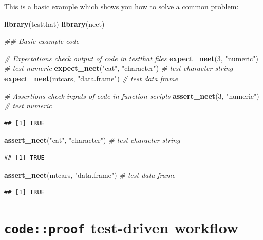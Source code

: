 \documentclass[
]{article}
\newenvironment{Shaded}{\begin{snugshade}}{\end{snugshade}}
\newcommand{\CommentTok}[1]{\textcolor[rgb]{0.56,0.35,0.01}{\textit{#1}}}
\newcommand{\DecValTok}[1]{\textcolor[rgb]{0.00,0.00,0.81}{#1}}
\newcommand{\KeywordTok}[1]{\textcolor[rgb]{0.13,0.29,0.53}{\textbf{#1}}}
\newcommand{\NormalTok}[1]{#1}
\newcommand{\StringTok}[1]{\textcolor[rgb]{0.31,0.60,0.02}{#1}}
\begin{document}
This is a basic example which shows you how to solve a common problem:

\begin{Shaded}
\begin{Highlighting}[]
\KeywordTok{library}\NormalTok{(testthat)}
\KeywordTok{library}\NormalTok{(neet)}

\CommentTok{\#\# Basic example code}

\CommentTok{\# Expectations check output of code in testthat files}
\KeywordTok{expect\_neet}\NormalTok{(}\DecValTok{3}\NormalTok{, }\StringTok{"numeric"}\NormalTok{) }\CommentTok{\# test numeric}
\KeywordTok{expect\_neet}\NormalTok{(}\StringTok{"cat"}\NormalTok{, }\StringTok{"character"}\NormalTok{) }\CommentTok{\# test character string}
\KeywordTok{expect\_neet}\NormalTok{(mtcars, }\StringTok{"data.frame"}\NormalTok{) }\CommentTok{\# test data frame}

\CommentTok{\# Assertions check inputs of code in function scripts}
\KeywordTok{assert\_neet}\NormalTok{(}\DecValTok{3}\NormalTok{, }\StringTok{"numeric"}\NormalTok{) }\CommentTok{\# test numeric}
\end{Highlighting}
\end{Shaded}

\begin{verbatim}
## [1] TRUE
\end{verbatim}

\begin{Shaded}
\begin{Highlighting}[]
\KeywordTok{assert\_neet}\NormalTok{(}\StringTok{"cat"}\NormalTok{, }\StringTok{"character"}\NormalTok{) }\CommentTok{\# test character string}
\end{Highlighting}
\end{Shaded}

\begin{verbatim}
## [1] TRUE
\end{verbatim}

\begin{Shaded}
\begin{Highlighting}[]
\KeywordTok{assert\_neet}\NormalTok{(mtcars, }\StringTok{"data.frame"}\NormalTok{) }\CommentTok{\# test data frame}
\end{Highlighting}
\end{Shaded}

\begin{verbatim}
## [1] TRUE
\end{verbatim}

\hypertarget{codeproof-test-driven-workflow}{%
\section{\texorpdfstring{\texttt{code::proof} test-driven
workflow}{code::proof test-driven workflow}}\label{codeproof-test-driven-workflow}}
\end{document}
